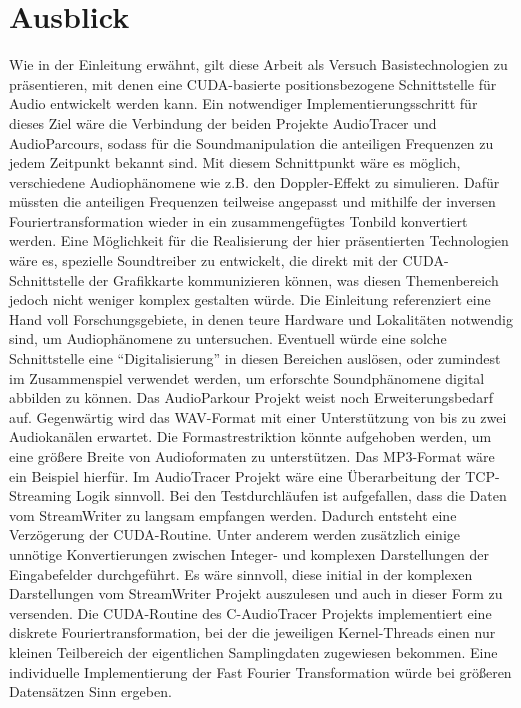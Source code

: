 
\section{Ausblick} \label{chap:farsight}

Wie in der Einleitung erwähnt, gilt diese Arbeit als Versuch Basistechnologien zu präsentieren, mit denen eine CUDA-basierte positionsbezogene Schnittstelle für Audio entwickelt werden kann. Ein notwendiger Implementierungsschritt für dieses Ziel wäre die Verbindung der beiden Projekte AudioTracer und AudioParcours, sodass für die Soundmanipulation die anteiligen Frequenzen zu jedem Zeitpunkt bekannt sind. Mit diesem Schnittpunkt wäre es möglich, verschiedene Audiophänomene wie z.B. den Doppler-Effekt zu simulieren. Dafür müssten die anteiligen Frequenzen teilweise angepasst und mithilfe der inversen Fouriertransformation wieder in ein zusammengefügtes Tonbild konvertiert werden. Eine Möglichkeit für die Realisierung der hier präsentierten Technologien wäre es, spezielle Soundtreiber zu entwickelt, die direkt mit der CUDA-Schnittstelle der Grafikkarte kommunizieren können, was diesen Themenbereich jedoch nicht weniger komplex gestalten würde. Die Einleitung referenziert eine Hand voll Forschungsgebiete, in denen teure Hardware und Lokalitäten notwendig sind, um Audiophänomene zu untersuchen. Eventuell würde eine solche Schnittstelle eine \enquote{Digitalisierung} in diesen Bereichen auslösen, oder zumindest im Zusammenspiel verwendet werden, um erforschte Soundphänomene digital abbilden zu können. Das AudioParkour Projekt weist noch Erweiterungsbedarf auf. Gegenwärtig wird das WAV-Format mit einer Unterstützung von bis zu zwei Audiokanälen erwartet. Die Formastrestriktion könnte aufgehoben werden, um eine größere Breite von Audioformaten zu unterstützen. Das MP3-Format wäre ein Beispiel hierfür. Im AudioTracer Projekt wäre eine Überarbeitung der TCP-Streaming Logik sinnvoll. Bei den Testdurchläufen ist aufgefallen, dass die Daten vom StreamWriter zu langsam empfangen werden. Dadurch entsteht eine Verzögerung der CUDA-Routine. Unter anderem werden zusätzlich einige unnötige Konvertierungen zwischen Integer- und komplexen Darstellungen der Eingabefelder durchgeführt. Es wäre sinnvoll, diese initial in der komplexen Darstellungen vom StreamWriter Projekt auszulesen und auch in dieser Form zu versenden. Die CUDA-Routine des C-AudioTracer Projekts implementiert eine diskrete Fouriertransformation, bei der die jeweiligen Kernel-Threads einen nur kleinen Teilbereich der eigentlichen Samplingdaten zugewiesen bekommen. Eine individuelle Implementierung der Fast Fourier Transformation würde bei größeren Datensätzen Sinn ergeben. 

